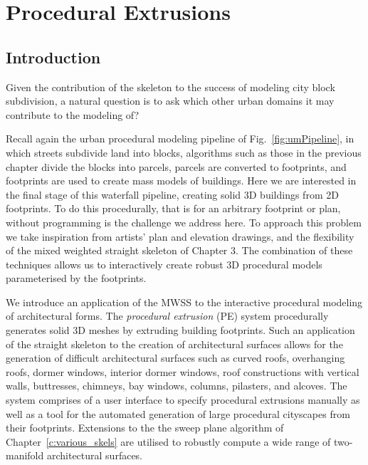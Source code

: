 \graphicspath{{13-procex/images/}}

\chapter{Procedural Extrusions}
\label{c:procex}



\section{Introduction}



Given the contribution of the skeleton to the success of modeling city block subdivision, a natural question is to ask which other urban domains it may contribute to the modeling of? 

Recall again the urban procedural modeling pipeline of Fig.~\ref{fig:umPipeline}, in which streets subdivide land into blocks, algorithms such as those in the previous chapter divide the blocks into parcels, parcels are converted to footprints, and footprints are used to create mass models of buildings. Here we are interested in the final stage of this waterfall pipeline, creating solid 3D buildings from 2D footprints. To do this procedurally, that is for an arbitrary footprint or plan, without programming is the challenge we address here. To approach this problem we take inspiration from artists' plan and elevation drawings, and the flexibility of the mixed weighted straight skeleton of Chapter 3. The combination of these techniques allows us to interactively create robust 3D procedural models parameterised by the footprints. 



We introduce an application of the MWSS to the interactive procedural modeling of architectural forms. The \emph{procedural extrusion} (PE) system procedurally generates solid 3D meshes by extruding building footprints. Such an application of the straight skeleton to the creation of architectural surfaces allows for the generation of difficult architectural surfaces such as curved roofs, overhanging roofs, dormer windows, interior dormer windows, roof constructions with vertical walls, buttresses, chimneys, bay windows, columns, pilasters, and alcoves. The system comprises of a user interface to specify procedural extrusions manually as well as a tool for the automated generation of large procedural cityscapes from their footprints. Extensions to the the sweep plane algorithm of Chapter~\ref{c:various_skels} are utilised to robustly compute a wide range of two-manifold architectural surfaces.


